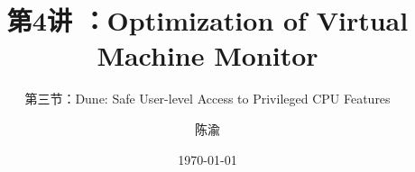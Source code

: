 


\title[第4讲]{第4讲 ：Optimization of Virtual Machine Monitor} %
\subtitle{第三节：Dune: Safe User-level Access to Privileged CPU Features}
\author{陈渝} %
\date{\today} %




\begin{frame}
\titlepage %
\end{frame}

%
%


